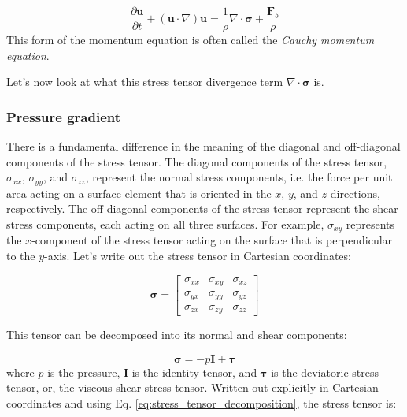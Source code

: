 \documentclass[12pt]{article}
\numberwithin{equation}{section}
\numberwithin{figure}{section}
\numberwithin{table}{section}
\begin{document}
\begin{equation}
  \frac{\partial \mathbf{u}}{\partial t} + (\mathbf{u} \cdot \nabla) \mathbf{u} =
  \frac{1}{\rho} \nabla \cdot \boldsymbol{\sigma} + \frac{\mathbf{F}_b}{\rho}
  \label{eq:momentum_cauchy}
\end{equation}
This form of the momentum equation is often called the
\textit{Cauchy momentum equation}.

Let's now look at what this stress tensor divergence term
$\nabla \cdot \boldsymbol{\sigma}$ is.

\subsubsection{Pressure gradient}

There is a fundamental difference in the meaning of the diagonal and off-diagonal
components of the stress tensor.
The diagonal components of the stress tensor, $\sigma_{xx}$, $\sigma_{yy}$, and
$\sigma_{zz}$, represent the normal stress components, i.e. the force per unit
area acting on a surface element that is oriented in the $x$, $y$, and $z$
directions, respectively.
The off-diagonal components of the stress tensor represent the shear stress
components, each acting on all three surfaces.
For example, $\sigma_{xy}$ represents the $x$-component of the stress tensor
acting on the surface that is perpendicular to the $y$-axis.
Let's write out the stress tensor in Cartesian coordinates:

\begin{equation}
  \boldsymbol{\sigma} = \begin{bmatrix}
    \sigma_{xx} & \sigma_{xy} & \sigma_{xz} \\
    \sigma_{yx} & \sigma_{yy} & \sigma_{yz} \\
    \sigma_{zx} & \sigma_{zy} & \sigma_{zz}
  \end{bmatrix}
\end{equation}

This tensor can be decomposed into its normal and shear components:

\begin{equation}
  \boldsymbol{\sigma} = -p \mathbf{I} + \boldsymbol{\tau}
  \label{eq:stress_tensor_decomposition}
\end{equation}
where $p$ is the pressure, $\mathbf{I}$ is the identity tensor,
and $\boldsymbol{\tau}$ is the deviatoric stress tensor, or, the viscous shear
stress tensor.
Written out explicitly in Cartesian coordinates and using Eq.
\ref{eq:stress_tensor_decomposition}, the stress tensor is:
\end{document}
